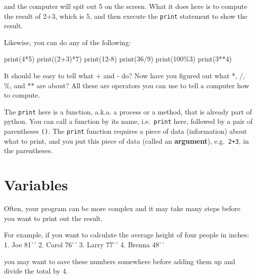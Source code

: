 \documentclass[
  letterpaper,
]{scrbook}
\newenvironment{Shaded}{\begin{snugshade}}{\end{snugshade}}
\newcommand{\BuiltInTok}[1]{\textcolor[rgb]{0.00,0.23,0.31}{#1}}
\newcommand{\DecValTok}[1]{\textcolor[rgb]{0.68,0.00,0.00}{#1}}
\newcommand{\NormalTok}[1]{\textcolor[rgb]{0.00,0.23,0.31}{#1}}
\newcommand{\OperatorTok}[1]{\textcolor[rgb]{0.37,0.37,0.37}{#1}}
\begin{document}
and the computer will spit out 5 on the screen. What it does here is to
compute the result of 2+3, which is 5, and then execute the
\texttt{print} statement to show the result.

Likewise, you can do any of the following:

\begin{Shaded}
\begin{Highlighting}[]
\BuiltInTok{print}\NormalTok{(}\DecValTok{4}\OperatorTok{*}\DecValTok{5}\NormalTok{)}
\BuiltInTok{print}\NormalTok{((}\DecValTok{2}\OperatorTok{+}\DecValTok{3}\NormalTok{)}\OperatorTok{*}\DecValTok{7}\NormalTok{)}
\BuiltInTok{print}\NormalTok{(}\DecValTok{12}\OperatorTok{{-}}\DecValTok{8}\NormalTok{)}
\BuiltInTok{print}\NormalTok{(}\DecValTok{36}\OperatorTok{/}\DecValTok{9}\NormalTok{)}
\BuiltInTok{print}\NormalTok{(}\DecValTok{100}\OperatorTok{\%}\DecValTok{3}\NormalTok{)}
\BuiltInTok{print}\NormalTok{(}\DecValTok{3}\OperatorTok{**}\DecValTok{4}\NormalTok{)}
\end{Highlighting}
\end{Shaded}

It should be easy to tell what + and - do? Now have you figured out what
*, /, \%, and ** are about? All these are operators you can use to tell
a computer how to compute.

The \texttt{print} here is a function, a.k.a. a process or a method,
that is already part of python. You can call a function by its name,
i.e.~\texttt{print} here, followed by a pair of parentheses \texttt{()}.
The \texttt{print} function requires a piece of data (information) about
what to print, and you put this piece of data (called an
\textbf{argument}), e.g.~\texttt{2+3}, in the parentheses.

\section*{Variables}\label{variables}


Often, your program can be more complex and it may take many steps
before you want to print out the result.

For example, if you want to calculate the average height of four people
in inches: 1. Joe 81'\,' 2. Carol 76'\,' 3. Larry 77'\,' 4. Brenna
48'\,'

you may want to save these numbers somewhere before adding them up and
divide the total by 4.
\end{document}

